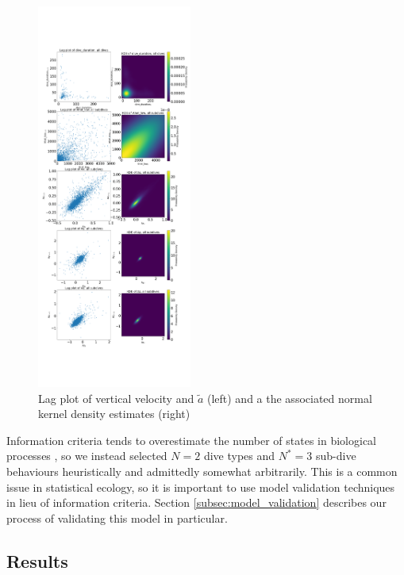 \begin{figure}[h!]
	\centering
	\includegraphics[height=5in]{../Plots/lagplot.png}
	\caption{Lag plot of vertical velocity and $\tilde a$ (left) and a the associated normal kernel density estimates (right)}
	\label{fig:lag}
\end{figure}

Information criteria tends to overestimate the number of states in biological processes \cite{Pohle:2017}, so we instead selected $N = 2$ dive types and $N^* = 3$ sub-dive behaviours heuristically and admittedly somewhat arbitrarily. This is a common issue in statistical ecology, so it is important to use model validation techniques in lieu of information criteria. Section \ref{subsec:model_validation} describes our process of validating this model in particular.

\subsection{Results}

